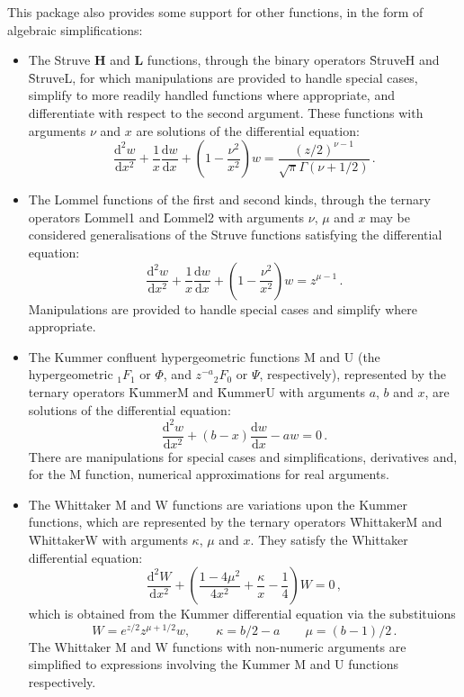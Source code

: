 This package also provides some support for other functions, in the form
of algebraic simplifications:
\begin{itemize}
\item The Struve \textbf{H} and \textbf{L} functions, through the binary
operators \f{StruveH} and \f{StruveL}, for which manipulations are
provided to handle special cases, simplify to more readily handled
functions where appropriate, and differentiate with respect to the second
argument. These functions with arguments $\nu$ and $x$ are solutions of the
differential equation:
$$\frac{\mathrm{d}^2w}{\mathrm{d}x^2}+\frac{1}{x}\frac{\mathrm{d}w}{\mathrm{d}x}
+\left(1-\frac{\nu^2}{x^2}\right)w
= \frac{(z/2)^{\nu-1}}{\sqrt{\pi}\Gamma(\nu+1/2)}\,.$$
\item The Lommel functions of the first and second kinds, through the
ternary operators \f{Lommel1} and \f{Lommel2} with arguments $\nu$, $\mu$
and $x$ may be considered generalisations of the Struve functions satisfying
the differential equation:
$$\frac{\mathrm{d}^2w}{\mathrm{d}x^2}+\frac{1}{x}\frac{\mathrm{d}w}{\mathrm{d}x}
+\left(1-\frac{\nu^2}{x^2}\right)w = z^{\mu-1}\,.$$
Manipulations are provided to handle special cases and simplify where
appropriate.
\item The Kummer confluent hypergeometric functions M and U (the
hypergeometric ${_1F_1}$ or $\Phi$, and $z^{-a}{_2F_0}$ or $\Psi$,
respectively), represented by the ternary operators \f{KummerM} and \f{KummerU} with
arguments $a$, $b$ and $x$, are solutions of the differential equation:
$$\frac{\mathrm{d}^2w}{\mathrm{d}x^2}+(b-x)\frac{\mathrm{d} w}{\mathrm{d}x}
-a w = 0\,.$$
There are manipulations for special cases and simplifications, derivatives
and, for the M function, numerical approximations for real arguments.
\item The Whittaker M and W functions are variations upon the Kummer
functions, which are represented by the ternary operators \f{WhittakerM} and 
\f{WhittakerW} with arguments $\kappa$, $\mu$ and $x$.
They satisfy the Whittaker differential equation:
$$\frac{\mathrm{d}^2W}{\mathrm{d}x^2}+\left(\frac{1-4\mu^2}{4x^2}+
\frac{\kappa}{x} -\frac{1}{4}\right)W =0\,,$$
which is obtained from the Kummer differential equation via the substituions
$$W=e^{z/2}z^{\mu+1/2} w,\qquad \kappa=b/2-a\qquad \mu =(b-1)/2\,.$$
The Whittaker M and W functions with non-numeric arguments are simplified to
expressions involving the Kummer M and U functions respectively.
\end{itemize}

